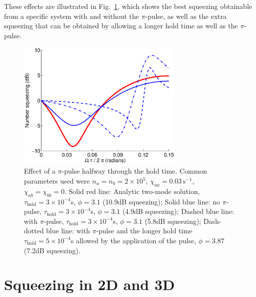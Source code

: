 \documentclass{iopart}
\begin{document}
These effects are illustrated in Fig.~\ref{piPulseFig}, which shows the best squeezing obtainable from a specific system with and without the $\pi$-pulse, as well as the extra squeezing that can be obtained by allowing a longer hold time as well as the $\pi$-pulse.
\begin{figure}
    \centering
    \includegraphics[width=8cm]{figures/pi_pulse.eps}
    \caption{Effect of a $\pi$-pulse halfway through the hold time. Common parameters used were $n_a = n_b =2 \times 10^5$, $\chi_{aa}=0.03\,\text{s}^{-1}$, $\chi_{ab}=\chi_{bb}=0$. Solid red line: Analytic two-mode solution, $\tau_{\mathrm{hold}}=3\times 10^{-4}$s, $\phi=3.1$ (10.9dB squeezing); Solid blue line: no $\pi$-pulse, $\tau_{\mathrm{hold}}=3\times 10^{-4}$s, $\phi=3.1$ (4.9dB squeezing);  Dashed blue line: with $\pi$-pulse, $\tau_{\mathrm{hold}}=3\times 10^{-4}$s, $\phi=3.1$ (5.8dB squeezing); Dash-dotted blue line: with $\pi$-pulse and the longer hold time $\tau_{\mathrm{hold}}=5\times 10^{-4}$s allowed by the application of the pulse, $\phi=3.87$ (7.2dB squeezing).}
    \label{piPulseFig}
\end{figure}

\section{Squeezing in 2D and 3D} \label{sec:2D3Dsqueezing}
\end{document}
